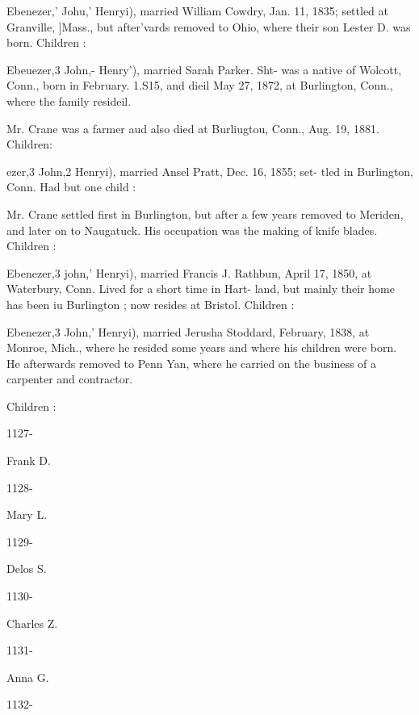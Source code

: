 \documentclass{book}
\begin{document}
Ebenezer,' Johu,' Henryi), married William Cowdry, Jan. 11, 
1835; settled at Granville, ]Mass., but after'vards removed to 
Ohio, where their son Lester D. was born. Children : 





Ebeuezer,3 John,- Henry'), married Sarah Parker. Sht- was a 
native of Wolcott, Conn., born in February. 1.S15, and dieil 
May 27, 1872, at Burlington, Conn., where the family resideil. 




Mr. Crane was a farmer aud also died at Burliugtou, Conn., Aug. 
19, 1881. Children: 

ezer,3 John,2 Henryi), married Ansel Pratt, Dec. 16, 1855; set- 
tled in Burlington, Conn. Had but one child : 


Mr. Crane settled first in Burlington, but after a few years 
removed to Meriden, and later on to Naugatuck. His occupation 
was the making of knife blades. Children : 


Ebenezer,3 john,' Henryi), married Francis J. Rathbun, April 
17, 1850, at Waterbury, Conn. Lived for a short time in Hart- 
land, but mainly their home has been iu Burlington ; now resides 
at Bristol. Children : 







Ebenezer,3 John,' Henryi), married Jerusha Stoddard, February, 
1838, at Monroe, Mich., where he resided some years and where 
his children were born. He afterwards removed to Penn Yan, 
where he carried on the business of a carpenter and contractor. 

Children : 



1127- 




Frank D. 


1128- 




Mary L. 


1129- 




Delos S. 


1130- 




Charles Z. 


1131- 




Anna G. 


1132- 
\end{document}
